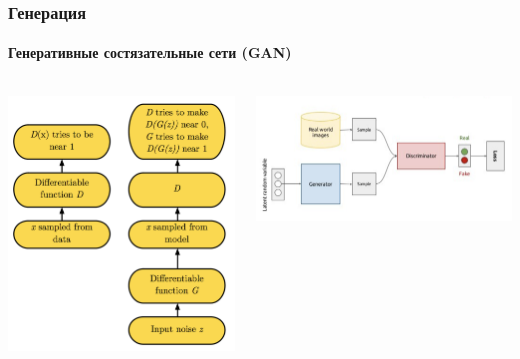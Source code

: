 \documentclass[10pt]{beamer}
\begin{document}
\begin{frame}
\frametitle{Генерация}
\framesubtitle{Генеративные состязательные сети (GAN)}


\begin{columns}
    \begin{column}{0.35\textwidth}
        \begin{center}
            \includegraphics[width=\textwidth]{images/gan_fw.png}
        \end{center}
    \end{column}
    \begin{column}{0.65\textwidth}
        \begin{center}
            \vskip-8mm
            \includegraphics[width=\textwidth]{images/fan_ov.png}\\

\end{center}
\end{column}
\end{columns}
\end{frame}
\end{document}
